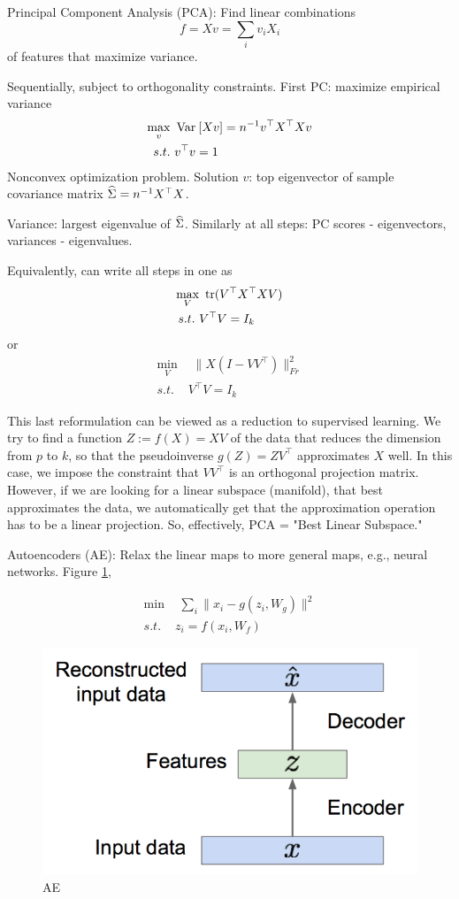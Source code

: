\documentclass[english]{article}
\begin{document}
Principal Component Analysis (PCA): Find linear combinations 
$$f = Xv = \sum_i v_i X_i$$ 
of features that maximize variance. 


Sequentially, subject to orthogonality constraints. First PC: maximize empirical variance 
\begin{align*}
\max_v\,\,  &\operatorname{Var}_{}\left[Xv\right] = n^{-1} v^\top X^\top Xv\\
s.t.\,\,&v^\top v=1
\end{align*}
Nonconvex optimization problem. Solution $v$: top eigenvector of sample covariance matrix $\widehat{\Sigma} = n^{-1} X^\top X$.

Variance: largest eigenvalue of $\widehat{\Sigma}$. 
Similarly at all steps: PC scores - eigenvectors, variances - eigenvalues. 

Equivalently, can write all steps in one as 
\begin{align*}
\max_V&\,\, \operatorname{tr} (V^\top X^\top XV)\\
s.t.\,\,&V^\top V=I_k
\end{align*}
or 
\begin{align*}
\min_V&\,\,\|X(I-VV^\top)\|_{Fr}^2\\
s.t.\,\,&V^\top V=I_k
\end{align*}

This last reformulation can be viewed as a reduction to supervised learning. We try to find a function $Z:=f(X)=XV$ of the data that reduces the dimension from $p$ to $k$, so that the pseudoinverse $g(Z) = ZV^\top$ approximates $X$ well. In this case, we impose the constraint that $VV^\top$ is an orthogonal projection matrix. However, if we are looking for a linear subspace (manifold), that best approximates the data, we automatically get that the approximation operation has to be a linear projection. So, effectively, PCA = "Best Linear Subspace."


\item Autoencoders (AE): Relax the linear maps to more general maps, e.g., neural networks.  Figure \ref{ae0},

\begin{align*}
\min&\,\,\sum_i \|x_i-g(z_i,W_g)\|^2\\
s.t.\,\,&z_i = f(x_i,W_f)
\end{align*}

\begin{figure}
  \centering
  \includegraphics[scale=0.5]{ae0.png}
    \caption{AE}
    \label{ae0}
\end{figure}
\end{document}
